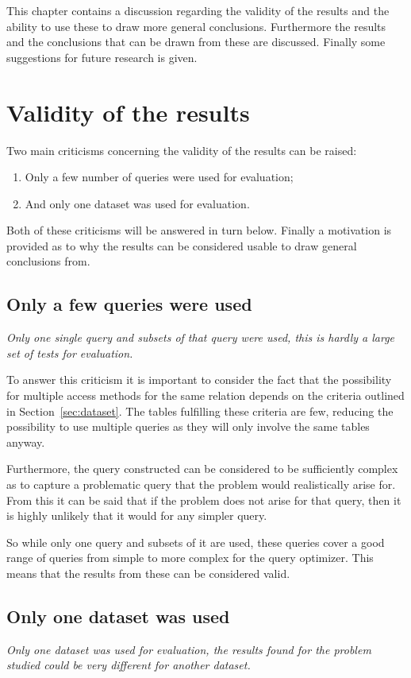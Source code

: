 This chapter contains a discussion regarding the validity of the results and the
ability to use these to draw more general conclusions. Furthermore the results
and the conclusions that can be drawn from these are discussed. Finally some
suggestions for future research is given.

\section{Validity of the results}\label{sec:validity}
Two main criticisms concerning the validity of the results can be raised:
\begin{enumerate}
\item Only a few number of queries were used for evaluation;
\item And only one dataset was used for evaluation.
\end{enumerate}

Both of these criticisms will be answered in turn below. Finally a motivation
is provided as to why the results can be considered usable to draw general conclusions from.

\subsection{Only a few queries were used}
\textit{Only one single query and subsets of that query were used, this is hardly a
  large set of tests for evaluation.}

To answer this criticism it is important to consider the fact that the
possibility for multiple access methods for the same relation depends on the
criteria outlined in Section~\ref{sec:dataset}. The tables fulfilling these
criteria are few, reducing the possibility to use multiple queries as they will
only involve the same tables anyway.

Furthermore, the query constructed can be considered to be sufficiently complex
as to capture a problematic query that the problem would realistically arise
for. From this it can be said that if the problem does not arise for that query,
then it is highly unlikely that it would for any simpler query.

So while only one query and subsets of it are used, these queries cover a good
range of queries from simple to more complex for the query optimizer. This means
that the results from these can be considered valid.

\subsection{Only one dataset was used}
\textit{Only one dataset was used for evaluation, the results found for the
  problem studied could be very different for another dataset.}

